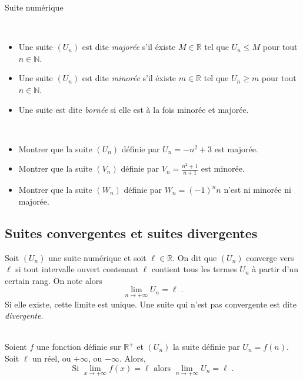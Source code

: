 \begin{chapter}{Suite num\'erique}
\begin{exe}
\end{exe}
%
\begin{defi} ~ \\
%
\begin{itemize} 
\item Une suite $(U_n)$ est dite \emph{major\'ee} s'il \'existe $M \in \mathbb{R}$ tel que $U_n \leq M$ pour tout $n \in \mathbb{N}$.
\item Une suite $(U_n)$ est dite \emph{minor\'ee} s'il \'existe $m \in \mathbb{R}$ tel que $U_n \geq m$ pour tout $n \in \mathbb{N}$.
\item Une suite est dite \emph{born\'ee} si elle est \`a la fois minor\'ee et major\'ee.
\end{itemize}
\end{defi}
%
\begin{exe}\label{exe:suite-2} ~ \\
\label{exe:suite bornee}
\begin{itemize} 
\item Montrer que la suite $(U_n)$ d\'efinie par $U_n = -n^2 + 3 $ est major\'ee.
\item Montrer que la suite $(V_n)$ d\'efinie par $V_n = \frac{n^2 + 1}{n + 1} $ est minor\'ee.
\item Montrer que la suite $(W_n)$ d\'efinie par $W_n = (-1)^n n $ n'est ni minor\'ee ni major\'ee.
\end{itemize}

\end{exe}
%
\subsection{Suites convergentes et suites divergentes}
%
\begin{defi}[Convergence]
Soit $(U_n)$ une suite num\'erique et soit $\ell \in \mathbb{R}$.
On dit que $(U_n)$ converge vers $\ell$ si tout intervalle ouvert contenant $\ell$ contient tous les termes $U_n$
\`a partir d'un certain rang. On note alors
$$
\lim_{n \rightarrow + \infty} U_n = \ell \; .
$$
Si elle existe, cette limite est unique.
Une suite qui n'est pas convergente est dite \emph{divergente}.
\end{defi}
%
\begin{prop} ~ \\
Soient $f$ une fonction d\'efinie sur $\mathbb{R}^+$ et $(U_n)$ la suite d\'efinie par ${U_n = f(n)}$.
Soit $\ell$ un r\'eel, ou $+\infty$, ou $-\infty$.
Alors, 
\[
\text{Si } \lim_{x \rightarrow + \infty} f(x) = \ell \text{ alors } \lim_{n \rightarrow + \infty} U_n = \ell      \; .
\]
\end{prop}


\end{chapter}
